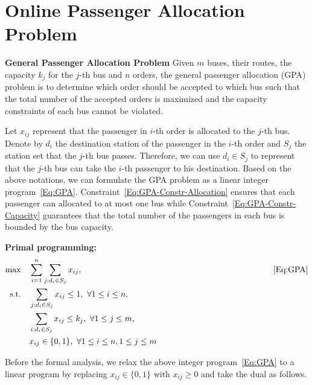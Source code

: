 \section{Online Passenger Allocation Problem}




{\bf General Passenger Allocation Problem}
Given $m$ buses, their routes, the capacity $k_j$ for the $j$-th bus and $n$ orders, the general passenger allocation (GPA) problem is to determine which order should be accepted to which bus such that the total number of the accepted orders is maximized and the capacity constraints of each bus cannot be violated.



Let $x_{ij}$ represent that the passenger in $i$-th order is allocated to the $j$-th bus. Denote by $d_i$ the destination station of the passenger in the $i$-th order and $S_j$ the station set that the $j$-th bus passes. Therefore, we can use $d_i \in S_j$ to represent that the $j$-th bus can take the $i$-th passenger to his destination. Based on the above notations, we can formulate the GPA problem as a linear integer program~\eqref{Eq:GPA}. Constraint~\eqref{Eq:GPA-Constr-Allocation} ensures that each passenger can allocated to at most one bus while Constraint~\eqref{Eq:GPA-Constr-Capacity} guarantees that the total number of the passengers in each bus is bounded by the bus capacity.


{\bf Primal programming:}
\begin{subequations}\label{Eq:GPA}
\centering
\begin{align}
	\max & \quad \sum_{i = 1}^n \sum_{j: d_i \in S_j} x_{ij}, \quad\quad\quad\quad\quad\quad\quad\quad\quad\quad\quad\quad\quad\quad\quad\quad\quad\quad\quad\quad\quad\quad\quad\eqref{Eq:GPA}\notag\\
	\text{s.t.} & \quad \sum_{j: d_i \in S_j} x_{ij} \le 1, \ \forall 1 \le i \le n, \label{Eq:GPA-Constr-Allocation} \\
    & \quad \sum_{i: d_i \in S_j} x_{ij} \le k_j, \ \forall 1 \le j \le m, \label{Eq:GPA-Constr-Capacity} \\
    & \quad x_{ij} \in \{0,1\} , \ \forall 1 \le i \le n, 1 \le j \le m \label{Eq:GPA-Constr-X}
\end{align}
\end{subequations}





Before the formal analysis, we relax the above integer program~\eqref{Eq:GPA} to a linear program by replacing $x_{ij} \in \{0,1\}$ with $x_{ij} \ge 0$ and take the dual as follows. 

